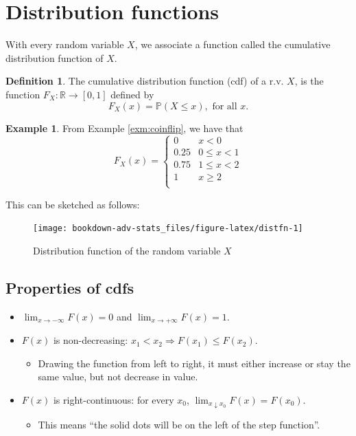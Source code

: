 \documentclass[
]{book}
\providecommand{\tightlist}{%
  \setlength{\itemsep}{0pt}\setlength{\parskip}{0pt}}
\newcommand{\bbR}{\mathbb{R}}
\newcommand{\bbP}{\mathbb{P}}
\theoremstyle{definition}
\newtheorem{definition}{Definition}[chapter]
\theoremstyle{definition}
\newtheorem{example}{Example}[chapter]
\theoremstyle{definition}
\theoremstyle{definition}
\theoremstyle{remark}
\begin{document}
\hypertarget{distribution-functions}{%
\section{Distribution functions}\label{distribution-functions}}

With every random variable \(X\), we associate a function called the cumulative distribution function of \(X\).

\begin{definition}
The cumulative distribution function (cdf) of a r.v. \(X\), is the function \(F_X:\bbR\to[0,1]\) defined by
\[
  F_X(x) = \bbP(X \leq x), \text{ for all } x.
\]
\end{definition}

\begin{example}

From Example \ref{exm:coinflip}, we have that
\[
F_X(x)=
\begin{cases}
0   &x < 0 \\
0.25  &0 \leq x < 1 \\
0.75  &1 \leq x < 2 \\
1  &x \geq 2 \\
\end{cases}
\]

This can be sketched as follows:

\begin{figure}

{\centering \texttt{[image: bookdown-adv-stats\_files/figure-latex/distfn-1]} 

}

\caption{Distribution function of the random variable $X$}\label{fig:distfn}
\end{figure}

\end{example}

\hypertarget{properties-of-cdfs}{%
\subsection{Properties of cdfs}\label{properties-of-cdfs}}

\begin{itemize}
\tightlist
\item
  \(\lim_{x\to-\infty} F(x) = 0\) and \(\lim_{x\to+\infty} F(x) = 1\).
\item
  \(F(x)\) is non-decreasing: \(x_1 < x_2 \Rightarrow F(x_1) \leq F(x_2)\).

  \begin{itemize}
  \tightlist
  \item
    Drawing the function from left to right, it must either increase or stay the same value, but not decrease in value.
  \end{itemize}
\item
  \(F(x)\) is right-continuous: for every \(x_0\), \(\lim_{x \downarrow x_0} F(x) = F(x_0)\).

  \begin{itemize}
  \tightlist
  \item
    This means ``the solid dots will be on the left of the step function''.
  \end{itemize}
\end{itemize}
\end{document}
